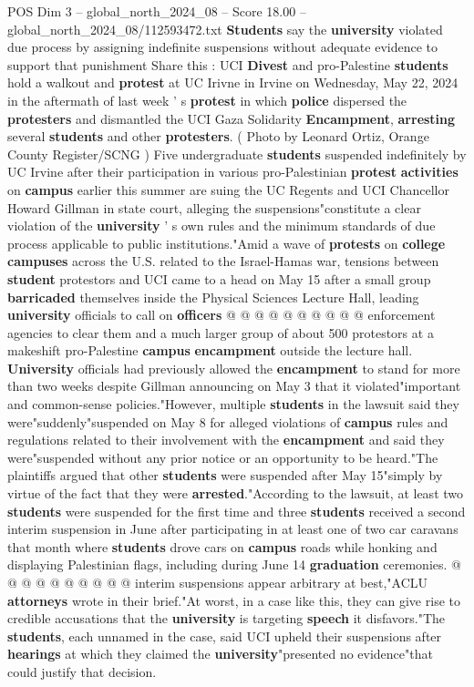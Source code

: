 \begin{textsample}{POS Dim 3 – global\_north\_2024\_08 – Score 18.00 – global\_north\_2024\_08/112593472.txt}  \label{ex:f3_pos_146}
\textbf{Students} say the \textbf{university} violated due process by assigning indefinite suspensions without adequate evidence to support that punishment Share this : UCI \textbf{Divest} and pro-Palestine \textbf{students} hold a walkout and \textbf{protest} at UC Irivne in Irvine on Wednesday, May 22, 2024 in the aftermath of last week ' s \textbf{protest} in which \textbf{police} dispersed the \textbf{protesters} and dismantled the UCI Gaza Solidarity \textbf{Encampment}, \textbf{arresting} several \textbf{students} and other \textbf{protesters}. ( Photo by Leonard Ortiz, Orange County Register/SCNG ) Five undergraduate \textbf{students} suspended indefinitely by UC Irvine after their participation in various pro-Palestinian \textbf{protest} \textbf{activities} on \textbf{campus} earlier this summer are suing the UC Regents and UCI Chancellor Howard Gillman in state court, alleging the suspensions"constitute a clear violation of the \textbf{university} ' s own rules and the minimum standards of due process applicable to public institutions."Amid a wave of \textbf{protests} on \textbf{college} \textbf{campuses} across the U.S. related to the Israel-Hamas war, tensions between \textbf{student} protestors and UCI came to a head on May 15 after a small group \textbf{barricaded} themselves inside the Physical Sciences Lecture Hall, leading \textbf{university} officials to call on \textbf{officers} @ @ @ @ @ @ @ @ @ @ enforcement agencies to clear them and a much larger group of about 500 protestors at a makeshift pro-Palestine \textbf{campus} \textbf{encampment} outside the lecture hall. \textbf{University} officials had previously allowed the \textbf{encampment} to stand for more than two weeks despite Gillman announcing on May 3 that it violated"important and common-sense policies."However, multiple \textbf{students} in the lawsuit said they were"suddenly"suspended on May 8 for alleged violations of \textbf{campus} rules and regulations related to their involvement with the \textbf{encampment} and said they were"suspended without any prior notice or an opportunity to be heard."The plaintiffs argued that other \textbf{students} were suspended after May 15"simply by virtue of the fact that they were \textbf{arrested}."According to the lawsuit, at least two \textbf{students} were suspended for the first time and three \textbf{students} received a second interim suspension in June after participating in at least one of two car caravans that month where \textbf{students} drove cars on \textbf{campus} roads while honking and displaying Palestinian flags, including during June 14 \textbf{graduation} ceremonies. @ @ @ @ @ @ @ @ @ @ interim suspensions appear arbitrary at best,"ACLU \textbf{attorneys} wrote in their brief."At worst, in a case like this, they can give rise to credible accusations that the \textbf{university} is targeting \textbf{speech} it disfavors."The \textbf{students}, each unnamed in the case, said UCI upheld their suspensions after \textbf{hearings} at which they claimed the \textbf{university}"presented no evidence"that could justify that decision.

\end{textsample}

